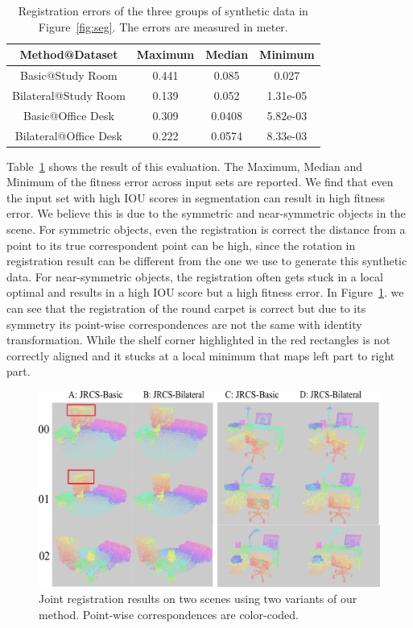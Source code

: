 \begin{table}
	\centering
	\caption{Registration errors of the three groups of synthetic data in Figure~\ref{fig:seg}. The errors are measured in meter.}
	\begin{tabular}{c | c c c}
		Method@Dataset&Maximum&Median&Minimum\\
		\hline 
		Basic@Study Room&0.441&0.085&0.027\\
		Bilateral@Study Room&0.139&0.052&1.31e-05\\
	    Basic@Office Desk&0.309&0.0408&5.82e-03\\
		Bilateral@Office Desk&0.222&0.0574&8.33e-03\\
	\end{tabular}
	\label{tab:regerror}
\end{table}

Table~\ref{tab:regerror} shows the result of this evaluation. The Maximum, Median and Minimum of the fitness error across input sets are reported.
%
We find that even the input set with high IOU scores in segmentation can result in high fitness error. We believe this is due to the symmetric and near-symmetric objects in the scene. For symmetric objects, even the registration is correct the distance from a point to its true correspondent point can be high, since the rotation in registration result can be different from the one we use to generate this synthetic data. For near-symmetric objects, the registration often gets stuck in a local optimal and results in a high IOU score but a high fitness error. In Figure~\ref{fig:reg_colorcode}. we can see that the registration of the round carpet is correct but due to its symmetry its point-wise correspondences are not the same with identity transformation.
While the shelf corner highlighted in the red rectangles is not correctly aligned and it stucks at a local minimum that maps left part to right part.
\begin{figure}[htb]
	\centering
	\includegraphics[width=\linewidth]{images/exp/exp_reg}
	\caption{Joint registration results on two scenes using two variants of our method. Point-wise correspondences are color-coded.}
	\label{fig:reg_colorcode}
\end{figure}

